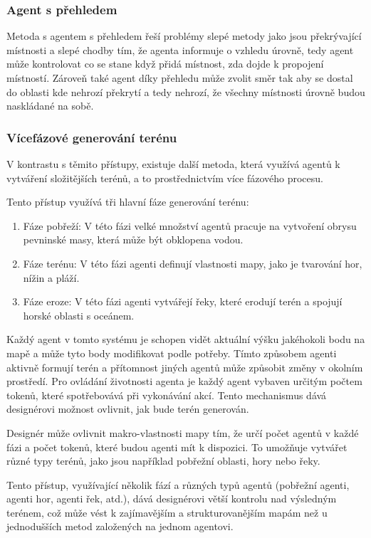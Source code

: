 \subsubsection{Agent s přehledem}
Metoda s agentem s přehledem řeší problémy slepé metody jako jsou překrývající místnosti a slepé chodby tím, že agenta informuje o vzhledu úrovně, tedy agent může kontrolovat co se stane když přidá místnost, zda dojde k propojení místností. Zároveň také agent díky přehledu může zvolit směr tak aby se dostal do oblasti kde nehrozí překrytí a tedy nehrozí, že všechny místnosti úrovně budou naskládané na sobě. \cite{PCGclanek}
\subsubsection{Vícefázové generování terénu}
V kontrastu s těmito přístupy, existuje další metoda, která využívá agentů k vytváření složitějších terénů, a to prostřednictvím více fázového procesu.

Tento přístup využívá tři hlavní fáze generování terénu:

\begin{enumerate}
    \item Fáze pobřeží: V této fázi velké množství agentů pracuje na vytvoření obrysu pevninské masy, která může být obklopena vodou.
    \item Fáze terénu: V této fázi agenti definují vlastnosti mapy, jako je tvarování hor, nížin a pláží.
    \item Fáze eroze: V této fázi agenti vytvářejí řeky, které erodují terén a spojují horské oblasti s oceánem.
\end{enumerate}

Každý agent v tomto systému je schopen vidět aktuální výšku jakéhokoli bodu na mapě a může tyto body modifikovat podle potřeby. Tímto způsobem agenti aktivně formují terén a přítomnost jiných agentů může způsobit změny v okolním prostředí. Pro ovládání životnosti agenta je každý agent vybaven určitým počtem tokenů, které spotřebovává při vykonávání akcí. Tento mechanismus dává designérovi možnost ovlivnit, jak bude terén generován.

Designér může ovlivnit makro-vlastnosti mapy tím, že určí počet agentů v každé fázi a počet tokenů, které budou agenti mít k dispozici. To umožňuje vytvářet různé typy terénů, jako jsou například pobřežní oblasti, hory nebo řeky.

Tento přístup, využívající několik fází a různých typů agentů (pobřežní agenti, agenti hor, agenti řek, atd.), dává designérovi větší kontrolu nad výsledným terénem, což může vést k zajímavějším a strukturovanějším mapám než u jednodušších metod založených na jednom agentovi. \cite{Agent-basedClanek}


